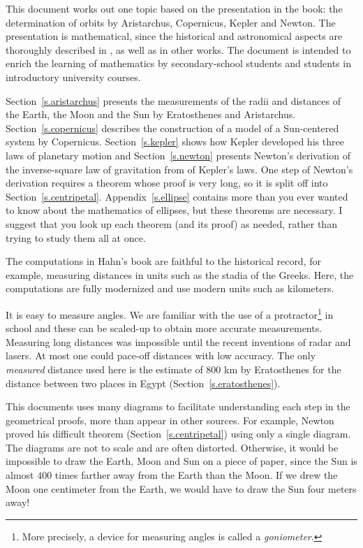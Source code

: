 This document works out one topic based on the presentation in the book: the determination of orbits by Aristarchus, Copernicus, Kepler and Newton. The presentation is mathematical, since the historical and astronomical aspects are thoroughly described in \cite{hahn-cic}, as well as in other works. The document is intended to enrich the learning of mathematics by secondary-school students and students in introductory university courses.

Section~\ref{s.aristarchus} presents the measurements of the radii and distances of the Earth, the Moon and the Sun by Eratosthenes and Aristarchus. Section~\ref{s.copernicus} describes the construction of a model of a Sun-centered system by Copernicus. Section~\ref{s.kepler} shows how Kepler developed his three laws of planetary motion and Section~\ref{s.newton} presents Newton's derivation of the inverse-square law of gravitation from of Kepler's laws. One step of Newton's derivation requires a theorem whose proof is very long, so it is split off into Section~\ref{s.centripetal}. Appendix~\ref{s.ellipse} contains more than you ever wanted to know about the mathematics of ellipses, but these theorems are necessary. I suggest that you look up each theorem (and its proof) as needed, rather than trying to study them all at once.

The computations in Hahn's book are faithful to the historical record, for example, measuring distances in units such as the stadia of the Greeks. Here,  the computations are fully modernized and use modern units such as kilometers.

It is easy to measure angles. We are familiar with the use of a protractor\footnote{More precisely, a device for measuring angles is called a \emph{goniometer}.} in school and these can be scaled-up to obtain more accurate measurements. Measuring long distances was impossible until the recent inventions of radar and lasers. At most one could pace-off distances with low accuracy. The only \emph{measured} distance used here is the estimate of $800$ km by Eratosthenes for the distance between two places in Egypt (Section~\ref{s.eratosthenes}).

This documents uses many diagrams to facilitate understanding each step in the geometrical proofs, more than appear in other sources. For example, Newton proved his difficult theorem (Section~\ref{s.centripetal}) using only a single diagram. The diagrams are not to scale and are often distorted. Otherwise, it would be impossible to draw the Earth, Moon and Sun on a piece of paper, since the Sun is almost $400$ times farther away from the Earth than the Moon. If we drew the Moon one centimeter from the Earth, we would have to draw the Sun four meters away!

